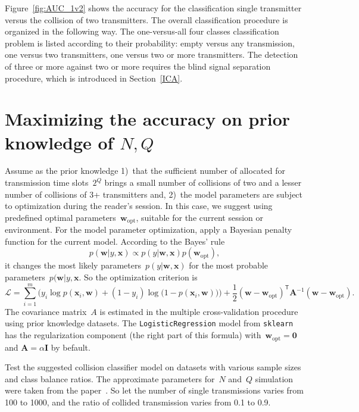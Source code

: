 \documentclass[12pt]{article}
\newcommand{\bw}{\mathbf{w}}
\newcommand{\T}{^\mathsf{T}}
\newcommand{\bx}{\mathbf{x}}
\begin{document}
Figure~\ref{fig:AUC_1v2} shows the accuracy for the classification single transmitter versus the collision of two transmitters. The overall classification procedure is organized in the following way. The one-versus-all four classes classification problem is listed according to their probability: empty versus any transmission, one versus two transmitters, one versus two or more transmitters. The detection of three or more against two or more requires the blind signal separation procedure, which is introduced in Section~\ref{ICA}.

\section{Maximizing the accuracy on prior knowledge of $N,Q$}

Assume as the prior knowledge 1)~that the sufficient number of allocated for transmission time slots~$2^Q$ brings a small number of collisions of two and a lesser number of collisions of 3+ transmitters and, 2)~the model parameters are subject to optimization during the reader's session. In this case, we suggest using predefined optimal parameters~$\bw_\text{opt}$, suitable for the current session or environment. For the model parameter optimization, apply a Bayesian penalty function for the current model. According to the Bayes' rule
\[
p(\bw|y,\bx) \propto p(y|\bw,\bx) p({\bw}_\text{opt}),
\]
it changes the most likely parameters~$p(y|\bw,\bx)$ for the most probable parameters~$p(\bw|y,\bx$. So the optimization criterion is 
\[
\mathcal{L}= \sum_{i=1}^m \biggl( y_i \log p(\bx_i,\bw) + (1-y_i) \log\bigl(1-p(\bx_i, \bw)\bigr)\biggr)+ \frac{1}{2}(\bw-\bw_\text{opt})\T\mathbf{A}^{-1}(\bw-\bw_\text{opt}).
\]
The covariance matrix~$A$ is estimated in the multiple cross-validation procedure using prior knowledge datasets. The \texttt{LogisticRegression} model from \texttt{sklearn} has the regularization component (the right part of this formula)  with~$\bw_\text{opt}=\boldsymbol{0}$ and $\mathbf{A} = \alpha\mathbf{I}$ by befault. 

Test the suggested collision classifier model on datasets with various sample sizes and class balance ratios. 
The approximate parameters for~$N$ and~$Q$ simulation were taken from the paper~\cite{Kang2011}. So let the number of single transmissions varies from 100 to 1000, and the ratio of collided transmission varies from 0.1 to 0.9.
\end{document}
